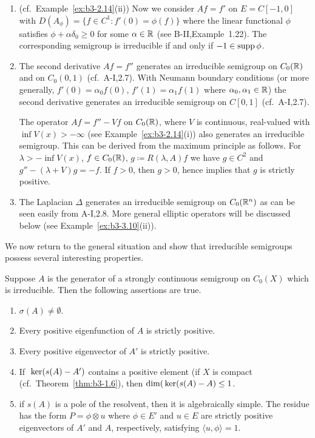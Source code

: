 \begin{examples}
\begin{enumerate}[\upshape (i), wide, labelindent=.5em]
	\item 
	(cf.\ Example~\ref{ex:b3-2.14}(ii)) Now we consider $Af = f'$ on $E = C[-1,0]$ with $D(A_{\phi}) = \{f \in C^1 \colon f'(0) = \phi(f)\}$ where the linear functional $\phi$ satisfies $\phi + \alpha\delta_{0} \geq 0$ for some $\alpha \in \mathbb{R}$ (see B-II,Example~1.22).
	The corresponding semigroup is irreducible if and only if $-1 \in \mathop{}\!\mathrm{supp}\,\phi$.
	
	\item 
	The second derivative $Af = f''$ generates an irreducible semigroup on $C_{0}(\mathbb{R})$ and on $C_{0}(0,1)$ (cf.\ A-I,2.7).
	With Neumann boundary conditions (or more generally, $f'(0) = \alpha_{0}f(0)$, $f'(1) = \alpha_{1}f(1)$ where $\alpha_{0}, \alpha_{1} \in \mathbb{R}$) the second derivative generates an irreducible semigroup on $C[0,1]$ (cf.\ A-I,2.7).
	
	The operator $Af = f'' - Vf$ on $C_{0}(\mathbb{R})$, where $V$ is continuous, real-valued with $\inf V(x) > -\infty$ (see Example~\ref{ex:b3-2.14}(i)) also generates an irreducible semigroup.
	This can be derived from the maximum principle as follows. 
    For $\lambda > -\inf V(x)$, $f \in C_{0}(\mathbb{R})$, $g \coloneq R(\lambda,A)f$ we have $g \in C^2$ and $g'' - (\lambda + V)g = -f$.
	If $f > 0$, then $g > 0$, hence \citet[Chap.I, Theorem~3]{protterweinberger:1967} implies that $g$ is strictly positive.
	
	\item 
	The Laplacian $\Delta$ generates an irreducible semigroup on $C_{0}(\mathbb{R}^n)$ as can be seen easily from A-I,2.8.
	More general elliptic operators will be discussed below (see Example~\ref{ex:b3-3.10}(ii)).
\end{enumerate}
\end{examples}
We now return to the general situation and show that irreducible semigroups possess several interesting properties.
\begin{proposition}\label{prop:b3-3.5}
	Suppose $A$ is the generator of a strongly continuous semigroup on $C_{0}(X)$ which is irreducible.
	Then the following assertions are true.
	\begin{enumerate}[\upshape (i)]
		\item 
		$\sigma(A) \neq \emptyset$.
		
		\item 
		Every positive eigenfunction of $A$ is strictly positive.
		
		\item 
		Every positive eigenvector of $A'$ is strictly positive.
		
		\item 
		If\ $\mathop{}\mathrm{ker}(s(A) - A')$ contains a positive element (\eg if $X$ is compact (cf.\ Theorem~\ref{thm:b3-1.6}), then $\dim(\mathop{}\mathrm{ker}(s(A) - A) \leq 1$.
		
		\item 
		if $s(A)$ is a pole of the resolvent, then it is algebraically simple.
		The residue has the form $P = \phi \otimes u$ where $\phi \in E'$ and $u \in E$ are strictly positive eigenvectors of $A'$ and $A$, respectively, satisfying $\langle u,\phi\rangle = 1$.
	\end{enumerate}
\end{proposition}
